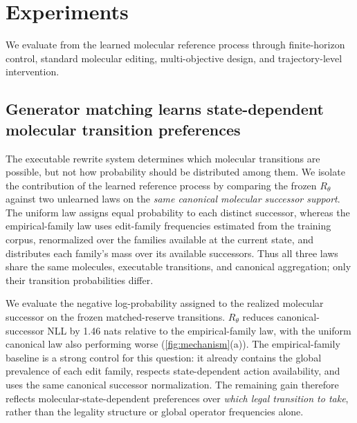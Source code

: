 %
\section{Experiments}
\label{sec:experiments}

We evaluate \method{} from the learned molecular reference process through finite-horizon control, standard molecular editing, multi-objective design, and trajectory-level intervention.

\subsection{Generator matching learns state-dependent molecular transition preferences}
\label{sec:exp-rtheta}

The executable rewrite system determines which molecular transitions are possible, but not how probability should be distributed among them. We isolate the contribution of the learned reference process by comparing the frozen $R_\theta$ against two unlearned laws on the \emph{same canonical molecular successor support}. The uniform law assigns equal probability to each distinct successor, whereas the empirical-family law uses edit-family frequencies estimated from the training corpus, renormalized over the families available at the current state, and distributes each family's mass over its available successors. Thus all three laws share the same molecules, executable transitions, and canonical aggregation; only their transition probabilities differ.

We evaluate the negative log-probability assigned to the realized molecular successor on the frozen matched-reserve transitions. $R_\theta$ reduces canonical-successor NLL by 1.46 nats relative to the empirical-family law, with the uniform canonical law also performing worse (\cref{fig:mechanism}(a)). The empirical-family baseline is a strong control for this question: it already contains the global prevalence of each edit family, respects state-dependent action availability, and uses the same canonical successor normalization. The remaining gain therefore reflects molecular-state-dependent preferences over \emph{which legal transition to take}, rather than the legality structure or global operator frequencies alone.

